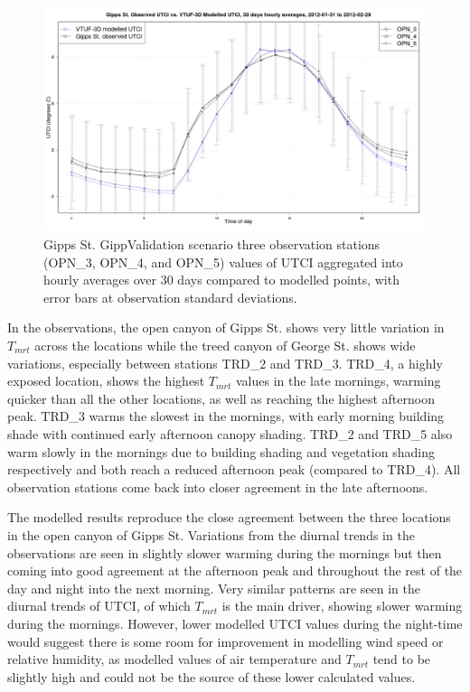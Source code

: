 \documentclass[final,3p,times,authoryear]{elsarticle}
\begin{document}
\begin{figure}[!htbp]
\includegraphics[trim = 0mm 0mm 0mm 0mm, clip, scale=0.32]{images/GippValidationUtciOverallAve5_.png}
\caption{Gipps St. GippValidation scenario three observation stations (OPN\_3, OPN\_4, and OPN\_5) values of UTCI aggregated into hourly averages over 30 days compared to modelled points, with error bars at observation standard deviations.\label{fig:GippsStUTCI30Compare}}
\end{figure}

In the observations, the open canyon of Gipps St. shows very little variation in $T_{mrt}$ across the locations while the treed canyon of George St. shows wide variations, especially between stations TRD\_2 and TRD\_3. TRD\_4, a highly exposed location, shows the highest $T_{mrt}$ values in the late mornings, warming quicker than all the other locations, as well as reaching the highest afternoon peak. TRD\_3 warms the slowest in the mornings, with early morning building shade with continued early afternoon canopy shading. TRD\_2 and TRD\_5 also warm slowly in the mornings due to building shading and vegetation shading respectively and both reach a reduced afternoon peak (compared to TRD\_4).  All observation stations come back into closer agreement in the late afternoons.

The modelled results reproduce the close agreement between the three locations in the open canyon of Gipps St. Variations from the diurnal trends in the observations are seen in slightly slower warming during the mornings but then coming into good agreement at the afternoon peak and throughout the rest of the day and night into the next morning. Very similar patterns are seen in the diurnal trends of UTCI, of which $T_{mrt}$ is the main driver, showing slower warming during the mornings. However, lower modelled UTCI values during the night-time would suggest there is some room for improvement in modelling wind speed or relative humidity, as modelled values of air temperature and $T_{mrt}$ tend to be slightly high and could not be the source of these lower calculated values.
\end{document}
